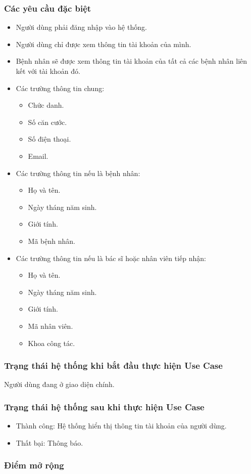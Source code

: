 \subsubsection{Các yêu cầu đặc biệt}
\begin{itemize}
  \item Người dùng phải đăng nhập vào hệ thống.
  \item Người dùng chỉ được xem thông tin tài khoản của mình.
  \item Bệnh nhân sẽ được xem thông tin tài khoản của tất cả các bệnh nhân liên kết với tài khoản đó.
  \item Các trường thông tin chung:
    \begin{itemize}
      \item Chức danh.
      \item Số căn cước.
      \item Số điện thoại.
      \item Email.
    \end{itemize}
  \item Các trường thông tin nếu là bệnh nhân:
    \begin{itemize}
      \item Họ và tên.
      \item Ngày tháng năm sinh.
      \item Giới tính.
      \item Mã bệnh nhân.
    \end{itemize}
  \item Các trường thông tin nếu là bác sĩ hoặc nhân viên tiếp nhận:
    \begin{itemize}
      \item Họ và tên.
      \item Ngày tháng năm sinh.
      \item Giới tính.
      \item Mã nhân viên.
      \item Khoa công tác.
    \end{itemize}
\end{itemize}

\subsubsection{Trạng thái hệ thống khi bắt đầu thực hiện Use Case}
Người dùng đang ở giao diện chính.

\subsubsection{Trạng thái hệ thống sau khi thực hiện Use Case}
\begin{itemize}
  \item Thành công: Hệ thống hiển thị thông tin tài khoản của người dùng.
  \item Thất bại: Thông báo.
\end{itemize}

\subsubsection{Điểm mở rộng}
